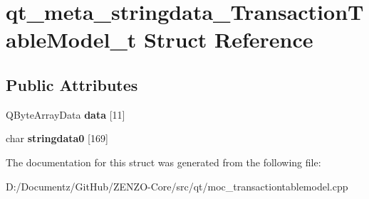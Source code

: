 \hypertarget{structqt__meta__stringdata___transaction_table_model__t}{}\section{qt\+\_\+meta\+\_\+stringdata\+\_\+\+Transaction\+Table\+Model\+\_\+t Struct Reference}
\label{structqt__meta__stringdata___transaction_table_model__t}
\subsection*{Public Attributes}
\begin{DoxyCompactItemize}
\item 
\mbox{\label{structqt__meta__stringdata___transaction_table_model__t_aafecffc2b4883e6fb247ee4b3578c315}} 
Q\+Byte\+Array\+Data {\bfseries data} \mbox{[}11\mbox{]}
\item 
\mbox{\label{structqt__meta__stringdata___transaction_table_model__t_ab1ddff0272efe67fd4fd1a6eabff7bd7}} 
char {\bfseries stringdata0} \mbox{[}169\mbox{]}
\end{DoxyCompactItemize}


The documentation for this struct was generated from the following file\+:\begin{DoxyCompactItemize}
\item 
D\+:/\+Documentz/\+Git\+Hub/\+Z\+E\+N\+Z\+O-\/\+Core/src/qt/moc\+\_\+transactiontablemodel.\+cpp\end{DoxyCompactItemize}
